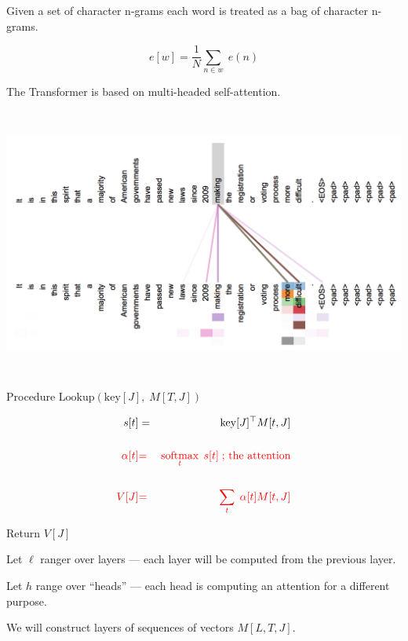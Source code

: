 {\vfill
Given a set of character n-grams each word is treated as a bag of character n-grams.

\vfill
$$e[w] = \frac{1}{N} \sum_{n \in w}\; e(n)$$


The Transformer is based on multi-headed self-attention.

\centerline{\includegraphics[height  = 3.5in]{../images/Transformera}}

Procedure $\mathrm{Lookup}(\mathrm{key}[J],\;M[T,J])$

\bigskip
\begin{eqnarray*}
s[t] & = &\mathrm{key}[J]^\top M[t,J] \\
\\
{\color{red} \alpha[t]} & {\color{red} =} & {\color{red} \operatorname*{softmax}_t \;s[t]\;\mbox{; the attention}} \\
\\
{\color{red} V[J]} & {\color{red} =} & {\color{red} \sum_t\;\alpha[t]M[t,J]}
\end{eqnarray*}

\bigskip
Return $V[J]$


\vfill
Let $\ell$ ranger over layers --- each layer will be computed from the previous layer.

\vfill
Let $h$ range over ``heads'' --- each head is computing an attention for a different purpose.

\vfill
We will construct layers of sequences of vectors $M[L,T,J]$.

}
